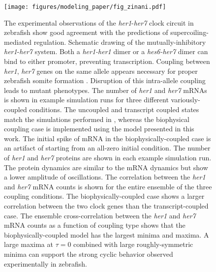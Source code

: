 \documentclass[11pt]{article}
\begin{document}
\begin{figure}[htbp]
    \centering
    {\texttt{[image: figures/modeling\_paper/fig\_zinani.pdf]}
    \label{fig:her1_her7_cartoon}
    \label{fig:zinani_summary_cartoon}
    \label{fig:zinani_mRNA_behavior}
    \label{fig:zinani_protein_behavior}
    \label{fig:zinani_correlation_coeff}
    \label{fig:zinani_cross_correlation}
    }
\end{figure}
\begin{figure}[htbp]
    \ContinuedFloat
    \caption{The experimental observations of the \textit{her1}-\textit{her7} clock circuit in zebrafish\parencite{zinaniPairingSegmentationClock2021} show good agreement with the predictions of supercoiling-mediated regulation.
         Schematic drawing of the mutually-inhibitory \textit{her1}-\textit{her7} system. Both a \textit{her1-her1} dimer or a \textit{hes6-her7} dimer can bind to either promoter, preventing transcription.
         Coupling between \textit{her1}, \textit{her7} genes on the same allele appears necessary for proper zebrafish somite formation \parencite{zinaniPairingSegmentationClock2021}. Disruption of this intra-allele coupling leads to mutant phenotypes.
         The number of \textit{her1} and \textit{her7} mRNAs is shown in example simulation runs for three different variously-coupled conditions. The uncoupled and transcript coupled states match the simulations performed in \textcite{zinaniPairingSegmentationClock2021}, whereas the biophysical coupling case is implemented using the model presented in this work. The initial spike of mRNA in the biophysically-coupled case is an artifact of starting from an all-zero initial condition.
         The number of \textit{her1} and \textit{her7} proteins are shown in each example simulation run. The protein dynamics are similar to the mRNA dynamics but show a lower amplitude of oscillations.
         The correlation between the \textit{her1} and \textit{her7} mRNA counts is shown for the entire ensemble of the three coupling conditions. The biophysically-coupled case shows a larger correlation between the two clock genes than the transcript-coupled case.
         The ensemble cross-correlation between the \textit{her1} and \textit{her7} mRNA counts as a function of coupling type shows that the biophysically-coupled model has the largest minima and maxima. A large maxima at \(\tau = 0\) combined with large roughly-symmetric minima can support the strong cyclic behavior observed experimentally in zebrafish. %
    } \label{fig:top:her1_her7}
\end{figure}
\end{document}
